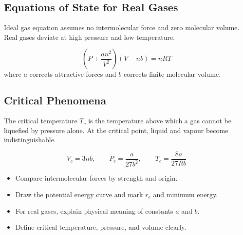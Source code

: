 \documentclass[12pt,a4paper]{article}
\begin{document}
\begin{tcolorbox}[tikzbox, title={Potential Energy Curve for Intermolecular Interaction}]
\centering
{}
\end{tcolorbox}

\subsection{Equations of State for Real Gases}
Ideal gas equation assumes no intermolecular force and zero molecular volume. Real gases deviate at high pressure and low temperature.

\begin{tcolorbox}[formulabox, title={Van der Waals Equation}]
\[
\left(P+\frac{a n^2}{V^2}\right)(V-nb)=nRT
\]
where $a$ corrects attractive forces and $b$ corrects finite molecular volume.
\end{tcolorbox}

\subsection{Critical Phenomena}
The critical temperature $T_c$ is the temperature above which a gas cannot be liquefied by pressure alone. At the critical point, liquid and vapour become indistinguishable.

\begin{tcolorbox}[formulabox, title={Critical Constants for a Van der Waals Gas}]
\[
V_c=3nb,\qquad P_c=\frac{a}{27b^2},\qquad T_c=\frac{8a}{27Rb}
\]
\end{tcolorbox}

\begin{tcolorbox}[exambox, title={Exam Points}]
\begin{itemize}[leftmargin=*, itemsep=2pt, topsep=2pt]
  \item Compare intermolecular forces by strength and origin.
  \item Draw the potential energy curve and mark $r_e$ and minimum energy.
  \item For real gases, explain physical meaning of constants $a$ and $b$.
  \item Define critical temperature, pressure, and volume clearly.
\end{itemize}
\end{tcolorbox}
\end{document}
